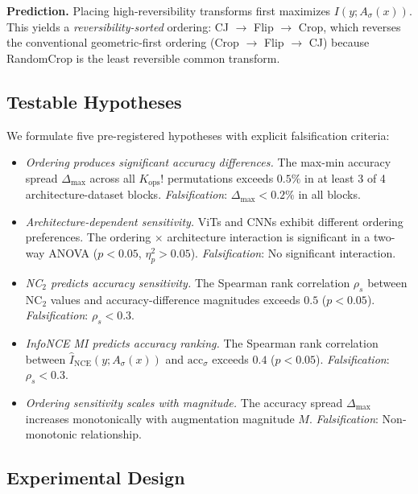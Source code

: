 \documentclass{article}
\begin{document}
\textbf{Prediction.} Placing high-reversibility transforms first maximizes $I(y; A_\sigma(x))$. This yields a \emph{reversibility-sorted} ordering: CJ $\to$ Flip $\to$ Crop, which reverses the conventional geometric-first ordering (Crop $\to$ Flip $\to$ CJ) because RandomCrop is the least reversible common transform.

\subsection{Testable Hypotheses}

We formulate five pre-registered hypotheses with explicit falsification criteria:

\begin{itemize}
\item[\textbf{H1}] \textit{Ordering produces significant accuracy differences.} The max-min accuracy spread $\Delta_{\max}$ across all $K_\text{ops}!$ permutations exceeds $0.5\%$ in at least 3 of 4 architecture-dataset blocks. \emph{Falsification}: $\Delta_{\max} < 0.2\%$ in all blocks.

\item[\textbf{H2}] \textit{Architecture-dependent sensitivity.} ViTs and CNNs exhibit different ordering preferences. The ordering $\times$ architecture interaction is significant in a two-way ANOVA ($p < 0.05$, $\eta^2_p > 0.05$). \emph{Falsification}: No significant interaction.

\item[\textbf{H3}] \textit{NC$_2$ predicts accuracy sensitivity.} The Spearman rank correlation $\rho_s$ between NC$_2$ values and accuracy-difference magnitudes exceeds $0.5$ ($p < 0.05$). \emph{Falsification}: $\rho_s < 0.3$.

\item[\textbf{H4}] \textit{InfoNCE MI predicts accuracy ranking.} The Spearman rank correlation between $\hat{I}_{\mathrm{NCE}}(y; A_\sigma(x))$ and $\mathrm{acc}_\sigma$ exceeds $0.4$ ($p < 0.05$). \emph{Falsification}: $\rho_s < 0.3$.

\item[\textbf{H5}] \textit{Ordering sensitivity scales with magnitude.} The accuracy spread $\Delta_{\max}$ increases monotonically with augmentation magnitude $M$. \emph{Falsification}: Non-monotonic relationship.
\end{itemize}

\subsection{Experimental Design}
\end{document}
